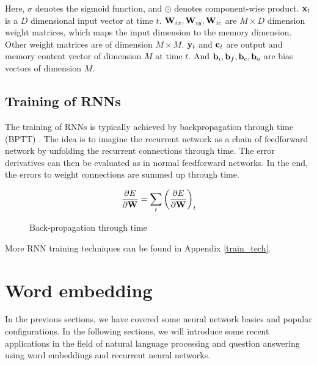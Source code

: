 Here, $\sigma$ denotes the sigmoid function, and $\odot$ denotes component-wise product. $\mathbf{x}_t$ is a $D$ dimensional input vector at time $t$. $\mathbf{W}_{ix}, \mathbf{W}_{iy}, \mathbf{W}_{ic}$ are $M \times D$ dimension weight matrices, which maps the input dimension to the memory dimension. Other weight matrices are of dimension $M \times M$. $\mathbf{y}_t$ and $ \mathbf{c}_t$ are output and memory content vector of dimension $M$ at time $t$. And $\mathbf{b}_i, \mathbf{b}_f, \mathbf{b}_c, \mathbf{b}_o$ are bias vectors of dimension $M$.

\subsection{Training of RNNs}
The training of RNNs is typically achieved by backpropagation through time (BPTT) \cite{mozer95}. The idea is to imagine the recurrent network as a chain of feedforward network by unfolding the recurrent connections through time. The error derivatives can then be evaluated as in normal feedforward networks. In the end, the errors to weight connections are summed up through time.

\begin{equation}
\dfrac{\partial E}{\partial \mathbf{W}} = \sum_t{\left(\dfrac{\partial E}{\partial \mathbf{W}}\right)_t}
\end{equation}

\begin{figure}  
\centering

\caption{Back-propagation through time}
\label{fig:bptt}
\end{figure}

More RNN training techniques can be found in Appendix \ref{train_tech}.

\section {Word embedding}
In the previous sections, we have covered some neural network basics and popular configurations. In the following sections, we will introduce some recent applications in the field of natural language processing and question answering using word embeddings and recurrent neural networks.

